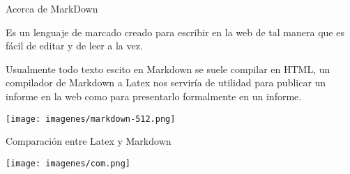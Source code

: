 \documentclass[11pt]{beamer}
\begin{document}
\begin{frame}
\titlepage
\end{frame}

\begin{frame}
\tableofcontents
\end{frame}

\begin{frame}{Acerca de MarkDown}

Es un lenguaje de marcado creado para escribir en la web de tal manera que es fácil de editar y de leer a la vez.

Usualmente todo texto escito en Markdown se suele compilar en HTML, un compilador de Markdown a Latex nos serviría de utilidad para publicar un informe en la web como para presentarlo formalmente en un informe.
\begin{center}
\texttt{[image: imagenes/markdown-512.png]} 
\end{center}
\end{frame}

\begin{frame}{Comparación entre Latex y Markdown}
\begin{center}
\texttt{[image: imagenes/com.png]} 
\end{center}
\end{frame}
\end{document}
